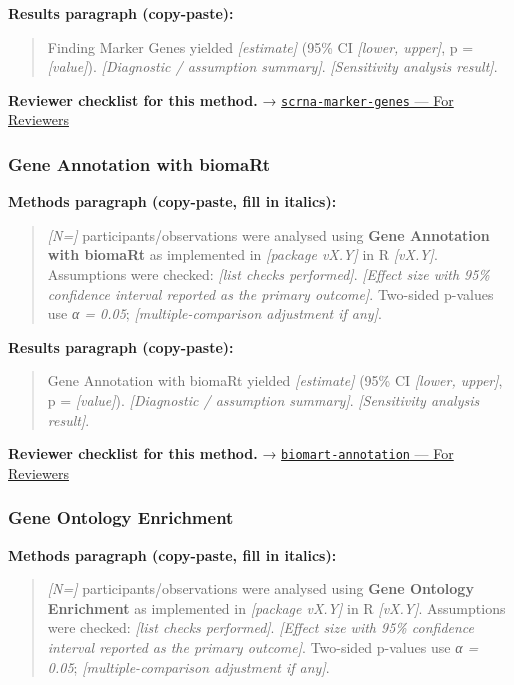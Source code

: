 \documentclass[
]{article}
\begin{document}
\textbf{Results paragraph (copy-paste):}

\begin{quote}
Finding Marker Genes yielded \emph{{[}estimate{]}} (95\% CI
\emph{{[}lower, upper{]}}, p = \emph{{[}value{]}}). \emph{{[}Diagnostic
/ assumption summary{]}}. \emph{{[}Sensitivity analysis result{]}}.
\end{quote}

\textbf{Reviewer checklist for this method.} →
\href{../chapters/12-bioinformatics/scrna-marker-genes.Rmd\#for-reviewers}{\texttt{scrna-marker-genes}
--- For Reviewers}

\subsubsection{Gene Annotation with
biomaRt}\label{gene-annotation-with-biomart}

\textbf{Methods paragraph (copy-paste, fill in italics):}

\begin{quote}
\emph{{[}N={]}} participants/observations were analysed using
\textbf{Gene Annotation with biomaRt} as implemented in \emph{{[}package
vX.Y{]}} in R \emph{{[}vX.Y{]}}. Assumptions were checked: \emph{{[}list
checks performed{]}}. \emph{{[}Effect size with 95\% confidence interval
reported as the primary outcome{]}}. Two-sided p-values use \emph{α =
0.05}; \emph{{[}multiple-comparison adjustment if any{]}}.
\end{quote}

\textbf{Results paragraph (copy-paste):}

\begin{quote}
Gene Annotation with biomaRt yielded \emph{{[}estimate{]}} (95\% CI
\emph{{[}lower, upper{]}}, p = \emph{{[}value{]}}). \emph{{[}Diagnostic
/ assumption summary{]}}. \emph{{[}Sensitivity analysis result{]}}.
\end{quote}

\textbf{Reviewer checklist for this method.} →
\href{../chapters/12-bioinformatics/biomart-annotation.Rmd\#for-reviewers}{\texttt{biomart-annotation}
--- For Reviewers}

\subsubsection{Gene Ontology Enrichment}\label{gene-ontology-enrichment}

\textbf{Methods paragraph (copy-paste, fill in italics):}

\begin{quote}
\emph{{[}N={]}} participants/observations were analysed using
\textbf{Gene Ontology Enrichment} as implemented in \emph{{[}package
vX.Y{]}} in R \emph{{[}vX.Y{]}}. Assumptions were checked: \emph{{[}list
checks performed{]}}. \emph{{[}Effect size with 95\% confidence interval
reported as the primary outcome{]}}. Two-sided p-values use \emph{α =
0.05}; \emph{{[}multiple-comparison adjustment if any{]}}.
\end{quote}
\end{document}
